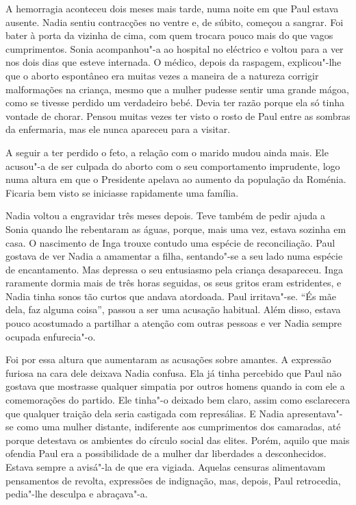 A hemorragia aconteceu dois meses mais tarde, numa noite em que Paul
estava ausente. Nadia sentiu contracções no ventre e, de súbito,
começou a sangrar. Foi bater à porta da vizinha de cima, com quem
trocara pouco mais do que vagos cumprimentos. Sonia acompanhou"-a ao
hospital no eléctrico e voltou para a ver nos dois dias que esteve
internada. O médico, depois da raspagem, explicou"-lhe que o aborto
espontâneo era muitas vezes a maneira de a natureza corrigir
malformações na criança, mesmo que a mulher pudesse sentir uma grande
mágoa, como se tivesse perdido um verdadeiro bebé. Devia ter razão
porque ela só tinha vontade de chorar. Pensou muitas vezes ter visto o
rosto de Paul entre as sombras da enfermaria, mas ele nunca apareceu
para a visitar.

A seguir a ter perdido o feto, a relação com o marido
mudou ainda mais. Ele acusou"-a de ser culpada do aborto com o seu
comportamento imprudente, logo numa altura em que o Presidente apelava
ao aumento da população
da Roménia. Ficaria bem visto se iniciasse rapidamente uma família.

Nadia voltou a engravidar três meses depois. Teve também de pedir
ajuda a Sonia quando lhe rebentaram as águas, porque, mais uma vez,
estava sozinha em casa. O nascimento de Inga trouxe contudo uma espécie
de reconciliação. Paul gostava de ver Nadia a amamentar a filha,
sentando"-se a seu lado numa espécie de encantamento. Mas depressa o
seu entusiasmo pela criança desapareceu. Inga raramente dormia mais de
três horas seguidas, os seus gritos eram estridentes, e Nadia tinha
sonos tão curtos que andava atordoada. Paul irritava"-se. ``És mãe dela,
faz alguma coisa'', passou a ser uma acusação habitual. Além disso,
estava pouco acostumado a partilhar a atenção com outras pessoas e ver
Nadia sempre ocupada enfurecia"-o.

Foi por essa altura que aumentaram as acusações
sobre amantes. A expressão furiosa na cara dele deixava Nadia confusa.
Ela já tinha percebido que Paul não gostava que mostrasse qualquer
simpatia por outros homens quando ia com ele a comemorações do partido.
Ele tinha"-o deixado bem claro, assim como esclarecera que qualquer
traição dela seria castigada com represálias. E Nadia apresentava"-se
como uma mulher distante, indiferente aos cumprimentos dos camaradas,
até porque detestava os ambientes do círculo social das elites. Porém,
aquilo que mais ofendia Paul era a possibilidade de a mulher dar
liberdades a desconhecidos. Estava sempre a avisá"-la de que era vigiada.
Aquelas censuras alimentavam pensamentos de revolta, expressões de
indignação, mas, depois, Paul retrocedia, pedia"-lhe desculpa e abraçava"-a.

